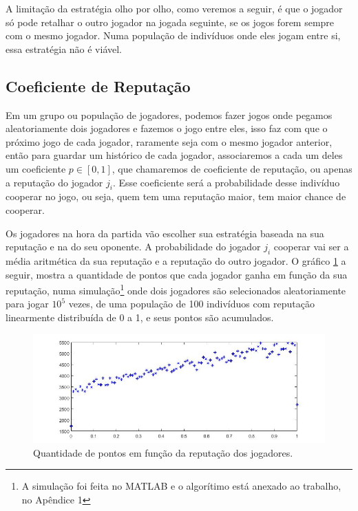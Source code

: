 A limitação da estratégia olho por olho, como veremos a seguir, é que o jogador só pode retalhar o outro jogador na jogada seguinte, se os jogos forem sempre com o mesmo jogador. Numa população de indivíduos onde eles jogam entre si, essa estratégia não é viável.

\subsection{Coeficiente de Reputação}

Em um grupo ou população de jogadores, podemos fazer jogos onde pegamos aleatoriamente dois jogadores e fazemos o jogo entre eles, isso faz com que o próximo jogo de cada jogador, raramente seja com o mesmo jogador anterior, então para guardar um histórico de cada jogador, associaremos a cada um deles um coeficiente $p\in[0,1]$, que chamaremos de coeficiente de reputação, ou apenas a reputação do jogador $j_i$. Esse coeficiente será a probabilidade desse indivíduo cooperar no jogo, ou seja, quem tem uma reputação maior, tem maior chance de cooperar. 

Os jogadores na hora da partida vão escolher sua estratégia baseada na sua reputação e na do seu oponente. A probabilidade do jogador $j_i$ cooperar vai ser a média aritmética da sua reputação e a reputação do outro jogador. O gráfico \ref{fig11} a seguir, mostra a quantidade de pontos que cada jogador ganha em função da sua reputação, numa simulação\footnote{A simulação foi feita no MATLAB e o algorítimo está anexado ao trabalho, no Apêndice 1} onde dois jogadores são selecionados aleatoriamente para jogar $10^5$ vezes, de uma população de 100 indivíduos com reputação linearmente distribuída de 0 a 1, e seus pontos são acumulados.

\begin{figure}[H]
\centering
\includegraphics[width=14cm]{imagens/graf11.jpg}
\caption{Quantidade de pontos em função da reputação dos jogadores.}
\label{fig11}
\end{figure}

